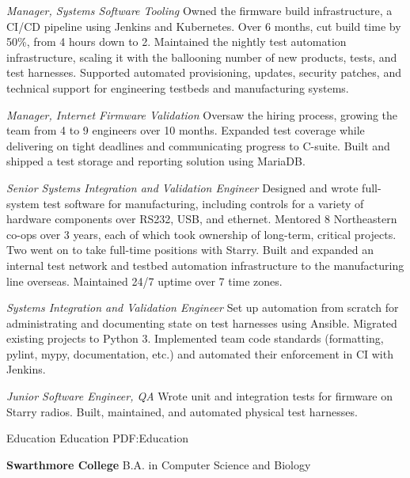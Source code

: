 \documentclass[letterpaper,MMMyyyy,nonstopmode]{simpleresumecv}
\begin{document}
\begin{Body}
\BigGap
\textit{Manager, Systems Software Tooling}
\Gap
\BulletItem
Owned the firmware build infrastructure, a CI/CD pipeline using Jenkins and
Kubernetes. Over 6 months, cut build time by 50\%, from 4 hours down to 2.
\BulletItem
Maintained the nightly test automation infrastructure, scaling it with
the ballooning number of new products, tests, and test harnesses.
\BulletItem
Supported automated provisioning, updates, security patches, and
technical support for engineering testbeds and manufacturing systems.

\BigGap
\textit{Manager, Internet Firmware Validation}
\Gap
\BulletItem
Oversaw the hiring process, growing the team from 4 to 9 engineers over 10
months.
\BulletItem
Expanded test coverage while delivering on tight deadlines and
communicating progress to C-suite.
\BulletItem
Built and shipped a test storage and reporting solution using MariaDB.

\BigGap
\textit{Senior Systems Integration and Validation Engineer}
\Gap
\BulletItem
Designed and wrote full-system test software for manufacturing,
including controls for a variety of hardware components over RS232,
USB, and ethernet.
\BulletItem
Mentored 8 Northeastern co-ops over 3 years, each of which took ownership of
long-term, critical projects. Two went on to take full-time positions with
Starry.
\BulletItem
Built and expanded an internal test network and testbed automation
infrastructure to the manufacturing line overseas. Maintained 24/7 uptime over
7 time zones.

\BigGap
\textit{Systems Integration and Validation Engineer}
\Gap
\BulletItem
Set up automation from scratch for administrating and documenting
state on test harnesses using Ansible.
\BulletItem
Migrated existing projects to Python 3.
\BulletItem
Implemented team code standards (formatting, pylint, mypy, documentation,
etc.) and automated their enforcement in CI with Jenkins.

\BigGap
\textit{Junior Software Engineer, QA}
\Gap
\BulletItem
Wrote unit and integration tests for firmware on Starry radios.
\BulletItem
Built, maintained, and automated physical test harnesses.

\Section
{Education}
{Education}
{PDF:Education}

\Entry
\textbf{Swarthmore College}
\Gap
B.A. in Computer Science and Biology

\end{Body}
\end{document}
